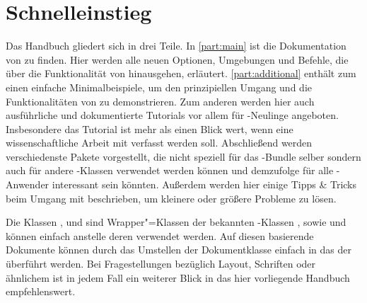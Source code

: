 \section{Schnelleinstieg}
Das Handbuch gliedert sich in drei Teile. In \autoref{part:main} ist die 
Dokumentation von \TUDScript zu finden. Hier werden alle neuen Optionen, 
Umgebungen und Befehle, die über die Funktionalität von \KOMAScript{} 
hinausgehen, erläutert. \autoref{part:additional} enthält zum einen einfache 
Minimalbeispiele, um den prinzipiellen Umgang und die Funktionalitäten von 
\TUDScript zu demonstrieren. Zum anderen werden hier auch ausführliche und 
dokumentierte Tutorials vor allem für -Neulinge angeboten. 
Insbesondere das Tutorial  ist mehr als einen Blick wert, 
wenn eine wissenschaftliche Arbeit mit  verfasst werden soll.
Abschließend werden verschiedenste Pakete vorgestellt, die nicht speziell für 
das \TUDScript-Bundle selber sondern auch für andere -Klassen
verwendet werden können und demzufolge für alle -Anwender 
interessant sein könnten. Außerdem werden hier einige Tipps \& Tricks beim 
Umgang mit  beschrieben, um kleinere oder größere Probleme zu 
lösen.

Die Klassen ,  und  
sind Wrapper"=Klassen der bekannten \KOMAScript-Klassen , 
 sowie  und können einfach anstelle deren 
verwendet werden. Auf diesen basierende Dokumente können durch das Umstellen 
der Dokumentklasse einfach in das \CD der \TnUD überführt werden. Bei 
Fragestellungen bezüglich Layout, Schriften oder ähnlichem ist in jedem Fall 
ein weiterer Blick in das hier vorliegende Handbuch empfehlenswert.
